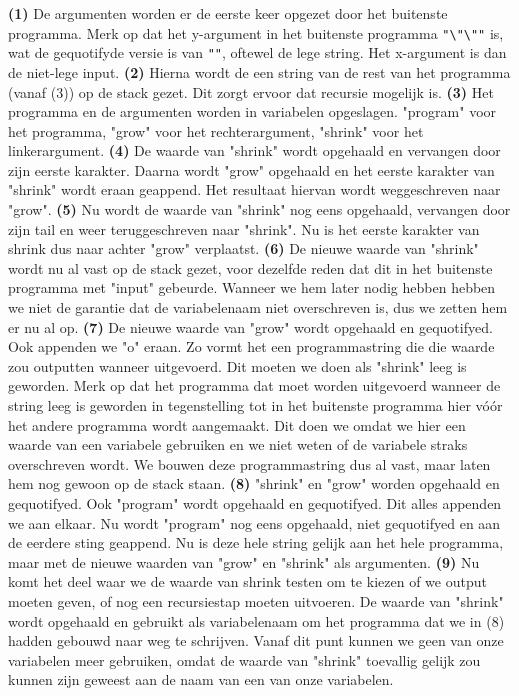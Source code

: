 \textbf{(1)} De argumenten worden er de eerste keer opgezet door het buitenste programma. Merk op dat het y-argument in het buitenste programma \texttt{"\textbackslash"\textbackslash""} is, wat de gequotifyde versie is van \texttt{""}, oftewel de lege string. Het x-argument is dan de niet-lege input.
\textbf{(2)} Hierna wordt de een string van de rest van het programma (vanaf (3)) op de stack gezet. Dit zorgt ervoor dat recursie mogelijk is.
\textbf{(3)} Het programma en de argumenten worden in variabelen opgeslagen. "program" voor het programma, "grow" voor het rechterargument, "shrink" voor het linkerargument.
\textbf{(4)} De waarde van "shrink" wordt opgehaald en vervangen door zijn eerste karakter. Daarna wordt "grow" opgehaald en het eerste karakter van "shrink" wordt eraan geappend. Het resultaat hiervan wordt weggeschreven naar "grow".
\textbf{(5)} Nu wordt de waarde van "shrink" nog eens opgehaald, vervangen door zijn tail en weer teruggeschreven naar "shrink". Nu is het eerste karakter van shrink dus naar achter "grow" verplaatst.
\textbf{(6)} De nieuwe waarde van "shrink" wordt nu al vast op de stack gezet, voor dezelfde reden dat dit in het buitenste programma met "input" gebeurde. Wanneer we hem later nodig hebben hebben we niet de garantie dat de variabelenaam niet overschreven is, dus we zetten hem er nu al op.
\textbf{(7)} De nieuwe waarde van "grow" wordt opgehaald en gequotifyed. Ook appenden we "o" eraan. Zo vormt het een programmastring die die waarde zou outputten wanneer uitgevoerd. Dit moeten we doen als "shrink" leeg is geworden. Merk op dat het programma dat moet worden uitgevoerd wanneer de string leeg is geworden in tegenstelling tot in het buitenste programma hier v\'{o}\'{o}r het andere programma wordt aangemaakt. Dit doen we omdat we hier een waarde van een variabele gebruiken en we niet weten of de variabele straks overschreven wordt. We bouwen deze programmastring dus al vast, maar laten hem nog gewoon op de stack staan.
\textbf{(8)} "shrink" en "grow" worden opgehaald en gequotifyed. Ook "program" wordt opgehaald en gequotifyed. Dit alles appenden we aan elkaar. Nu wordt "program" nog eens opgehaald, niet gequotifyed en aan de eerdere sting geappend. Nu is deze hele string gelijk aan het hele programma, maar met de nieuwe waarden van "grow" en "shrink" als argumenten.
\textbf{(9)} Nu komt het deel waar we de waarde van shrink testen om te kiezen of we output moeten geven, of nog een recursiestap moeten uitvoeren. De waarde van "shrink" wordt opgehaald en gebruikt als variabelenaam om het programma dat we in (8) hadden gebouwd naar weg te schrijven. Vanaf dit punt kunnen we geen van onze variabelen meer gebruiken, omdat de waarde van "shrink" toevallig gelijk zou kunnen zijn geweest aan de naam van een van onze variabelen.
